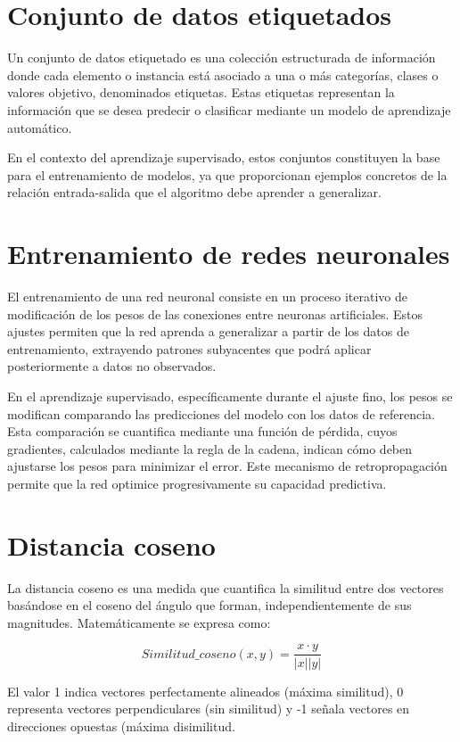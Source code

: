\section{Conjunto de datos etiquetados}
\label{anexo:datos_et}
Un conjunto de datos etiquetado es una colección estructurada de información donde cada elemento o instancia está asociado a una o más categorías, clases o valores objetivo, denominados etiquetas. Estas etiquetas representan la información que se desea predecir o clasificar mediante un modelo de aprendizaje automático.

En el contexto del aprendizaje supervisado, estos conjuntos constituyen la base para el entrenamiento de modelos, ya que proporcionan ejemplos concretos de la relación entrada-salida que el algoritmo debe aprender a generalizar.



\section{Entrenamiento de redes neuronales}
\label{anexo:entrenamiento_redes}
El entrenamiento de una red neuronal consiste en un proceso iterativo de modificación de los pesos de las conexiones entre neuronas artificiales. Estos ajustes permiten que la red aprenda a generalizar a partir de los datos de entrenamiento, extrayendo patrones subyacentes que podrá aplicar posteriormente a datos no observados.

En el aprendizaje supervisado, específicamente durante el ajuste fino, los pesos se modifican comparando las predicciones del modelo con los datos de referencia. Esta comparación se cuantifica mediante una función de pérdida, cuyos gradientes, calculados mediante la regla de la cadena, indican cómo deben ajustarse los pesos para minimizar el error. Este mecanismo de retropropagación permite que la red optimice progresivamente su capacidad predictiva.

\section{Distancia coseno}
\label{anexo:dis_cos}
La distancia coseno es una medida que cuantifica la similitud entre dos vectores basándose en el coseno del ángulo que forman, independientemente de sus magnitudes. Matemáticamente se expresa como: 

\[Similitud\_coseno(x,y) = \frac{x \cdot y}{|x||y|}\]

El valor 1 indica vectores perfectamente alineados (máxima similitud), 0 representa vectores perpendiculares (sin similitud) y -1 señala vectores en direcciones opuestas (máxima disimilitud.

